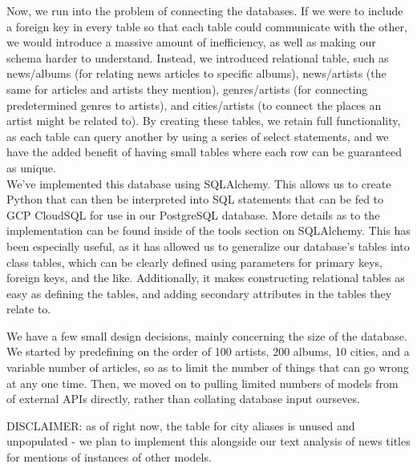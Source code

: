 \documentclass{scrartcl}
\begin{document}
    Now, we run into the problem of connecting the databases.
    If we were to include a foreign key in every table so that each table could communicate with the other, we would introduce a massive amount of inefficiency, as well as making our schema harder to understand.
    Instead, we introduced relational table, such as news/albums (for relating news articles to specific albums), news/artists (the same for articles and artists they mention), genres/artists (for connecting predetermined genres to artists), and cities/artists (to connect the places an artist might be related to).
    By creating these tables, we retain full functionality, as each table can query another by using a series of select statements, and we have the added benefit of having small tables where each row can be guaranteed as unique.\\

    We've implemented this database using SQLAlchemy.
    This allows us to create Python that can then be interpreted into SQL statements that can be fed to GCP CloudSQL for use in our PostgreSQL database.
    More details as to the implementation can be found inside of the tools section on SQLAlchemy.
    This has been especially useful, as it has allowed us to generalize our database's tables into class tables, which can be clearly defined using parameters for primary keys, foreign keys, and the like.
    Additionally, it makes constructing relational tables as easy as defining the tables, and adding secondary attributes in the tables they relate to.

    We have a few small design decisions, mainly concerning the size of the database.
    We started by predefining on the order of 100 artists, 200 albums, 10 cities, and a variable number of articles, so as to limit the number of things that can go wrong at any one time. Then, we moved on to pulling limited numbers of models from of external APIs directly, rather than collating database input ourseves.

    DISCLAIMER: as of right now, the table for city aliases is unused and unpopulated - we plan to implement this alongside our text analysis of news titles for mentions of instances of other models.

    \newpage
\end{document}
